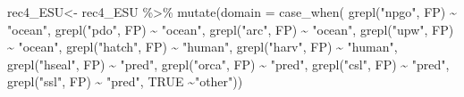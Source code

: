 \documentclass[
]{article}
\newenvironment{Shaded}{\begin{snugshade}}{\end{snugshade}}
\newcommand{\AttributeTok}[1]{\textcolor[rgb]{0.77,0.63,0.00}{#1}}
\newcommand{\ConstantTok}[1]{\textcolor[rgb]{0.00,0.00,0.00}{#1}}
\newcommand{\FunctionTok}[1]{\textcolor[rgb]{0.00,0.00,0.00}{#1}}
\newcommand{\NormalTok}[1]{#1}
\newcommand{\OtherTok}[1]{\textcolor[rgb]{0.56,0.35,0.01}{#1}}
\newcommand{\SpecialCharTok}[1]{\textcolor[rgb]{0.00,0.00,0.00}{#1}}
\newcommand{\StringTok}[1]{\textcolor[rgb]{0.31,0.60,0.02}{#1}}
\begin{document}
\begin{Shaded}
\begin{Highlighting}[]
\NormalTok{rec4\_ESU}\OtherTok{\textless{}{-}}\NormalTok{  rec4\_ESU }\SpecialCharTok{\%\textgreater{}\%} 
  \FunctionTok{mutate}\NormalTok{(}\AttributeTok{domain =} \FunctionTok{case\_when}\NormalTok{(}
    \FunctionTok{grepl}\NormalTok{(}\StringTok{"npgo"}\NormalTok{, FP) }\SpecialCharTok{\textasciitilde{}} \StringTok{"ocean"}\NormalTok{,}
    \FunctionTok{grepl}\NormalTok{(}\StringTok{"pdo"}\NormalTok{, FP) }\SpecialCharTok{\textasciitilde{}} \StringTok{"ocean"}\NormalTok{,}
    \FunctionTok{grepl}\NormalTok{(}\StringTok{"arc"}\NormalTok{, FP) }\SpecialCharTok{\textasciitilde{}} \StringTok{"ocean"}\NormalTok{,}
    \FunctionTok{grepl}\NormalTok{(}\StringTok{"upw"}\NormalTok{, FP) }\SpecialCharTok{\textasciitilde{}} \StringTok{"ocean"}\NormalTok{, }
    \FunctionTok{grepl}\NormalTok{(}\StringTok{"hatch"}\NormalTok{, FP) }\SpecialCharTok{\textasciitilde{}} \StringTok{"human"}\NormalTok{,}
    \FunctionTok{grepl}\NormalTok{(}\StringTok{"harv"}\NormalTok{, FP) }\SpecialCharTok{\textasciitilde{}} \StringTok{"human"}\NormalTok{,}
    \FunctionTok{grepl}\NormalTok{(}\StringTok{"hseal"}\NormalTok{, FP) }\SpecialCharTok{\textasciitilde{}} \StringTok{"pred"}\NormalTok{,}
    \FunctionTok{grepl}\NormalTok{(}\StringTok{"orca"}\NormalTok{, FP) }\SpecialCharTok{\textasciitilde{}} \StringTok{"pred"}\NormalTok{,}
    \FunctionTok{grepl}\NormalTok{(}\StringTok{"csl"}\NormalTok{, FP) }\SpecialCharTok{\textasciitilde{}} \StringTok{"pred"}\NormalTok{, }
    \FunctionTok{grepl}\NormalTok{(}\StringTok{"ssl"}\NormalTok{, FP) }\SpecialCharTok{\textasciitilde{}} \StringTok{"pred"}\NormalTok{, }
    \ConstantTok{TRUE} \SpecialCharTok{\textasciitilde{}}\StringTok{"other"}\NormalTok{))}



\end{Highlighting}
\end{Shaded}
\end{document}
